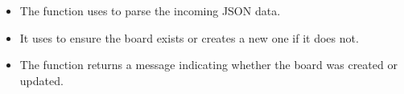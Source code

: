 \documentclass[letterpaper,10pt,english]{sphinxmanual}
\begin{document}
\begin{fulllineitems}
\begin{description}
\begin{itemize}
\item {} 
\sphinxAtStartPar
The function uses  to parse the incoming JSON data.

\item {} 
\sphinxAtStartPar
It uses  to ensure the board exists or creates a new one if it does not.

\item {} 
\sphinxAtStartPar
The function returns a message indicating whether the board was created or updated.

\end{itemize}

\end{description}

\end{fulllineitems}

\end{document}
